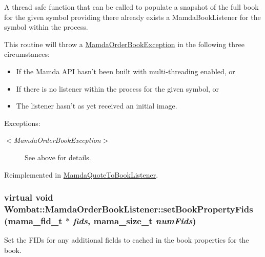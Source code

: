 A thread safe function that can be called to populate a snapshot of the full book for the given symbol providing there already exists a Mamda\-Book\-Listener for the symbol within the process. 

This routine will throw a \hyperlink{classWombat_1_1MamdaOrderBookException}{Mamda\-Order\-Book\-Exception} in the following three circumstances:\begin{itemize}
\item If the Mamda API hasn't been built with multi-threading enabled, or\item If there is no listener within the process for the given symbol, or\item The listener hasn't as yet received an initial image.\end{itemize}


\begin{Desc}
\item[Exceptions:]
\begin{description}
\item[{\em $<$Mamda\-Order\-Book\-Exception$>$}]See above for details. \end{description}
\end{Desc}


Reimplemented in \hyperlink{classMamdaQuoteToBookListener_161cca9523847d042a82af4924c91da6}{Mamda\-Quote\-To\-Book\-Listener}.\hypertarget{classWombat_1_1MamdaOrderBookListener_a2ed42c47a443eb5f65189cfa498b9e3}{
\subsubsection[setBookPropertyFids]{\setlength{\rightskip}{0pt plus 5cm}virtual void Wombat::Mamda\-Order\-Book\-Listener::set\-Book\-Property\-Fids (mama\_\-fid\_\-t $\ast$ {\em fids}, mama\_\-size\_\-t {\em num\-Fids})}}
\label{classWombat_1_1MamdaOrderBookListener_a2ed42c47a443eb5f65189cfa498b9e3}


Set the FIDs for any additional fields to cached in the book properties for the book. 

